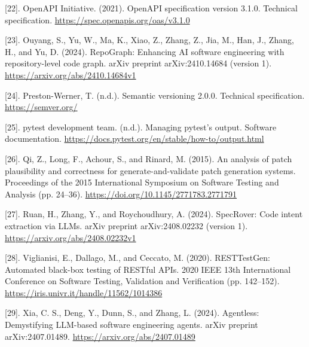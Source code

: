 \documentclass[12pt,a4paper,oneside]{report}
\begin{document}
\begingroup\setlength{\hangindent}{0pt} [22]. OpenAPI Initiative. (2021). OpenAPI specification version 3.1.0. Technical specification. \url{https://spec.openapis.org/oas/v3.1.0}\par\endgroup\vspace{6pt}
\begingroup\setlength{\hangindent}{0pt} [23]. Ouyang, S., Yu, W., Ma, K., Xiao, Z., Zhang, Z., Jia, M., Han, J., Zhang, H., and Yu, D. (2024). RepoGraph: Enhancing AI software engineering with repository-level code graph. arXiv preprint arXiv:2410.14684 (version 1). \url{https://arxiv.org/abs/2410.14684v1}\par\endgroup\vspace{6pt}
\begingroup\setlength{\hangindent}{0pt} [24]. Preston-Werner, T. (n.d.). Semantic versioning 2.0.0. Technical specification. \url{https://semver.org/}\par\endgroup\vspace{6pt}
\begingroup\setlength{\hangindent}{0pt} [25]. pytest development team. (n.d.). Managing pytest’s output. Software documentation. \url{https://docs.pytest.org/en/stable/how-to/output.html}\par\endgroup\vspace{6pt}
\begingroup\setlength{\hangindent}{0pt} [26]. Qi, Z., Long, F., Achour, S., and Rinard, M. (2015). An analysis of patch plausibility and correctness for generate-and-validate patch generation systems. Proceedings of the 2015 International Symposium on Software Testing and Analysis (pp. 24–36). \url{https://doi.org/10.1145/2771783.2771791}\par\endgroup\vspace{6pt}
\begingroup\setlength{\hangindent}{0pt} [27]. Ruan, H., Zhang, Y., and Roychoudhury, A. (2024). SpecRover: Code intent extraction via LLMs. arXiv preprint arXiv:2408.02232 (version 1). \url{https://arxiv.org/abs/2408.02232v1}\par\endgroup\vspace{6pt}
\begingroup\setlength{\hangindent}{0pt} [28]. Viglianisi, E., Dallago, M., and Ceccato, M. (2020). RESTTestGen: Automated black-box testing of RESTful APIs. 2020 IEEE 13th International Conference on Software Testing, Validation and Verification (pp. 142–152). \url{https://iris.univr.it/handle/11562/1014386}\par\endgroup\vspace{6pt}
\begingroup\setlength{\hangindent}{0pt} [29]. Xia, C. S., Deng, Y., Dunn, S., and Zhang, L. (2024). Agentless: Demystifying LLM-based software engineering agents. arXiv preprint arXiv:2407.01489. \url{https://arxiv.org/abs/2407.01489}\par\endgroup\vspace{6pt}
\end{document}
